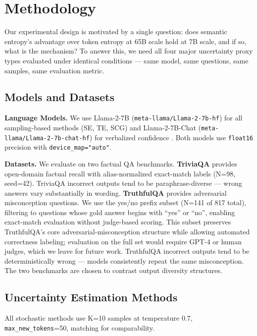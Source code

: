 \section{Methodology}
\label{sec:method}

Our experimental design is motivated by a single question: does semantic entropy's advantage over token entropy at 65B scale \citep{Kuhn2023} hold at 7B scale, and if so, what is the mechanism?
To answer this, we need all four major uncertainty proxy types evaluated under identical conditions --- same model, same questions, same samples, same evaluation metric.

\subsection{Models and Datasets}

\textbf{Language Models.}
We use Llama-2-7B (\texttt{meta-llama/Llama-2-7b-hf}) for all sampling-based methods (SE, TE, SCG) and Llama-2-7B-Chat (\texttt{meta-llama/Llama-2-7b-chat-hf}) for verbalized confidence \citep{Touvron2023}.
Both models use \texttt{float16} precision with \texttt{device\_map="auto"}.

\textbf{Datasets.}
We evaluate on two factual QA benchmarks.
\textbf{TriviaQA} \citep{Joshi2017} provides open-domain factual recall with alias-normalized exact-match labels (N=98, seed=42).
TriviaQA incorrect outputs tend to be paraphrase-diverse --- wrong answers vary substantially in wording.
\textbf{TruthfulQA} \citep{Lin2022a} provides adversarial misconception questions.
We use the yes/no prefix subset (N=141 of 817 total), filtering to questions whose gold answer begins with ``yes'' or ``no'', enabling exact-match evaluation without judge-based scoring.
This subset preserves TruthfulQA's core adversarial-misconception structure while allowing automated correctness labeling; evaluation on the full set would require GPT-4 or human judges, which we leave for future work.
TruthfulQA incorrect outputs tend to be deterministically wrong --- models consistently repeat the same misconception.
The two benchmarks are chosen to contrast output diversity structures.

\subsection{Uncertainty Estimation Methods}

All stochastic methods use K=10 samples at temperature 0.7, \texttt{max\_new\_tokens}=50, matching \citet{Kuhn2023} for comparability.

